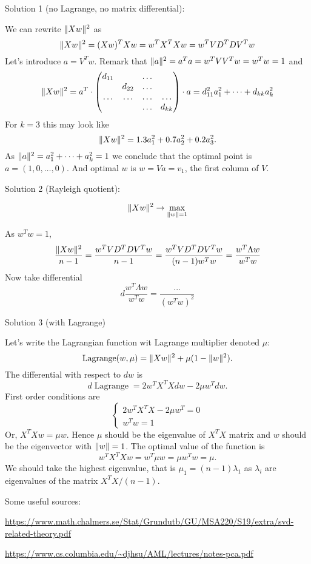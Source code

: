\documentclass[12pt]{article}
\DeclareMathOperator{\Lagr}{Lagrange}
\DeclarePairedDelimiter{\norm}{\lVert}{\rVert}
\begin{document}
Solution 1 (no Lagrange, no matrix differential):

We can rewrite $\norm{Xw}^2$ as
\[
\norm{Xw}^2 = (Xw)^T Xw = w^T X^T Xw = w^T VD^T DV^T w
\]
Let's introduce $a = V^T w$.
Remark that $\norm{a}^2 = a^T a = w^T VV^T w = w^T w = 1$ and
\[
    \norm{Xw}^2 = a^T \cdot \begin{pmatrix}
        d_{11} &  & \dots &  \\
          & d_{22} & \dots &  \\
        \dots & \dots & \dots & \dots \\
         &  & \dots & d_{kk} \\
    \end{pmatrix} \cdot a
    = d_{11}^2 a_1^2 + \dots + d_{kk} a_k^2
\]
For $k = 3$ this may look like
\[
    \norm{Xw}^2 = 1.3 a_1^2 + 0.7 a_2^2 + 0.2 a_3^2.
\]
As $\norm{a}^2 = a_1^2 + \dots + a_k^2 = 1$ we conclude that the optimal point is $a = (1, 0, \dots, 0)$. 
And optimal $w$ is $w = Va = v_1$, the first column of $V$.

Solution 2 (Rayleigh quotient):

\[
\norm{Xw}^2  \to \max_{\norm{w} = 1}
\]

As $w^Tw = 1$,
\[
    \frac{\norm{Xw}^2}{n - 1} = \frac{w^T VD^T DV^T w}{n-1} = \frac{w^T VD^T DV^T w }{ (n - 1)w^Tw }   = \frac{w^T \Lambda w}{ w^T w}
\]
Now take differential 
\[
d \frac{w^T \Lambda w}{ w^T w} = \frac{...}{ (w^T w)^2}
\]

Solution 3 (with Lagrange)

Let's write the Lagrangian function wit Lagrange multiplier denoted $\mu$:
\[
\Lagr(w, \mu) = \norm{Xw}^2 + \mu (1 - \norm{w}^2).
\]
The differential with respect to $dw$ is 
\[
d \Lagr = 2w^T X^T X dw - 2 \mu w^T dw.
\]
First order conditions are
\[
\begin{cases}
2w^T X^T X - 2 \mu w^T = 0 \\
w^Tw = 1  
\end{cases}
\]
Or, $X^TX w = \mu w$. 
Hence $\mu$ should be the eigenvalue of $X^TX$ matrix and $w$ should be the eigenvector with $\norm{w} = 1$.
The optimal value of the function is 
\[
w^T X^TX w = w^T \mu w = \mu w^T w = \mu.
\]
We should take the highest eigenvalue, that is $\mu_1 = (n - 1)\lambda_1$ as $\lambda_i$ are eigenvalues of the matrix $X^TX/(n-1)$.


Some useful sources:

\url{https://www.math.chalmers.se/Stat/Grundutb/GU/MSA220/S19/extra/svd-related-theory.pdf}

\url{https://www.cs.columbia.edu/~djhsu/AML/lectures/notes-pca.pdf}
\end{document}

